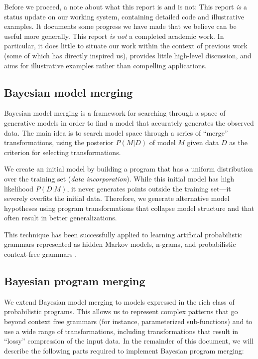 \documentclass[a4paper,10pt]{article}
\begin{document}
Before we proceed, a note about what this report is and is not: This report \emph{is} a status update on our working system, containing detailed code and illustrative examples. It documents some progress we have made that we believe can be useful more generally.
This report \emph{is not} a completed academic work. In particular, it does little to situate our work within the context of previous work (some of which has  directly inspired us), provides little high-level discussion, and aims for illustrative examples rather than compelling applications.

\subsection{Bayesian model merging}

Bayesian model merging \cite{Stolcke:1994:IPG:645515.658235} is a framework for searching through a space of generative models in order to find a model that accurately generates the observed data.  The main idea is to search model space through a series of ``merge'' transformations, using the posterior $P(M|D)$ of model $M$ given data $D$ as the criterion for selecting transformations.

We create an initial model by building a program that has a uniform distribution over the training set ({\em data incorporation}).  While this initial model has high likelihood $P(D|M)$, it never generates points outside the training set---it severely overfits the initial data. Therefore, we generate alternative model hypotheses using program transformations that collapse model structure and that often result in better generalizations.

This technique has been successfully applied to learning artificial probabilistic grammars represented as hidden Markov models, n-grams, and probabilistic context-free grammars \cite{Stolcke:1994:IPG:645515.658235}.


\subsection{Bayesian program merging}

We extend Bayesian model merging to models expressed in the rich class of probabilistic programs.  This allows us to represent complex patterns that go beyond context free grammars (for instance, parameterized sub-functions) and to use a wide range of transformations, including transformations that result in ``lossy'' compression of the input data. In the remainder of this document, we will describe the following parts required to implement Bayesian program merging:
\end{document}
